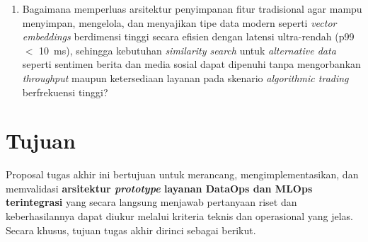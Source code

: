 \begin{enumerate}
    \vspace{0.5em}

    \item Bagaimana memperluas arsitektur penyimpanan fitur tradisional agar mampu menyimpan, mengelola, dan menyajikan tipe data modern seperti \textit{vector embeddings} berdimensi tinggi secara efisien dengan latensi ultra-rendah (p99 $<$ 10~ms), sehingga kebutuhan \textit{similarity search} untuk \textit{alternative data} seperti sentimen berita dan media sosial dapat dipenuhi tanpa mengorbankan \textit{throughput} maupun ketersediaan layanan pada skenario \textit{algorithmic trading} berfrekuensi tinggi?
\end{enumerate}

\section{Tujuan}

Proposal tugas akhir ini bertujuan untuk merancang, mengimplementasikan, dan memvalidasi \textbf{arsitektur \textit{prototype} layanan DataOps dan MLOps terintegrasi} yang secara langsung menjawab pertanyaan riset dan keberhasilannya dapat diukur melalui kriteria teknis dan operasional yang jelas. Secara khusus, tujuan tugas akhir dirinci sebagai berikut.

